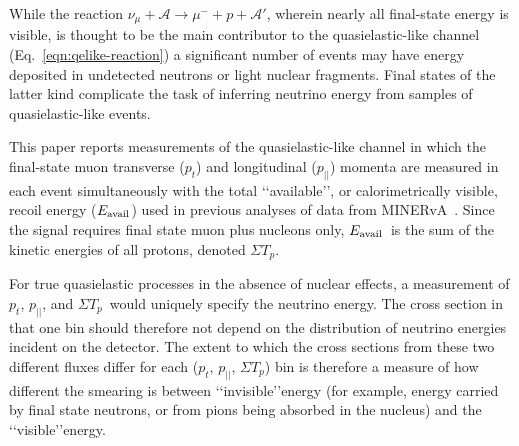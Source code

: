 \documentclass[aps,prl,twocolumn,showpacs,superscriptaddress, floatfix,10pt]{revtex4-2}
\newcommand{\pt}{\ensuremath{p_{t}}}
\newcommand{\pz}{\ensuremath{p_{||}}}
\newcommand{\eavail}{\ensuremath{E_{\rm\scriptstyle avail}}}
\newcommand{\sumtp}{\ensuremath{\Sigma T_{p}}}
\begin{document}
While the reaction $\nu_{\mu}+\mathcal{A}\rightarrow\mu^{-}+ p + \mathcal{A'}$, wherein nearly all final-state energy is visible, is thought to be the main contributor to the quasielastic-like channel (Eq.~\ref{eqn:qelike-reaction}) a significant number of events may have energy deposited in undetected neutrons or light nuclear fragments.  Final states of the latter kind complicate the task of inferring neutrino energy from samples of quasielastic-like events.

This paper reports measurements of the quasielastic-like channel in which the final-state muon transverse (\pt) and longitudinal (\pz) momenta are measured in each event simultaneously with the total \lq\lq available\rq\rq, or calorimetrically visible, recoil energy (\eavail) used in previous analyses of data from MINERvA~\cite{Rodrigues:2015hik,MINERvA:2018nab,MINERvA:2021wjs,MINERvA:2022mnw}.  Since the signal requires final state muon plus nucleons only, \eavail\ is  the sum of the kinetic energies of all protons, denoted \sumtp.  

For true quasielastic processes in the absence of nuclear effects, a measurement of \pt, \pz, and \sumtp\ would uniquely specify the neutrino energy.  The cross section in that one bin should therefore not depend on the distribution of neutrino energies incident on the detector.  The extent to which the cross sections from these two different fluxes differ for each (\pt, \pz, \sumtp )  bin is therefore a measure of how different the smearing is between \lq\lq invisible\rq\rq energy (for example, energy carried by final state neutrons, or from pions being absorbed in the nucleus) and the 
\lq\lq visible\rq\rq energy.  
\end{document}
